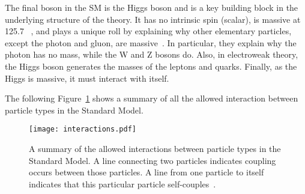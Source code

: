 The final boson in the SM is the Higgs boson and is a key building block
in the underlying structure of the theory. It has no intrinsic spin
(scalar), is massive at 125.7 \GeVcc~\cite{higgstwiki}, and plays a unique roll by
explaining why other elementary particles, except the photon and gluon, are
massive~\cite{discovery}. In particular, they explain why the photon has no
mass, while the W and Z bosons do. Also, in electroweak theory, the Higgs
boson generates the masses of the leptons and quarks. Finally, as the Higgs is
massive, it must interact with itself.

The following Figure~\ref{fig:intro_int} shows a summary of all the allowed
interaction between particle types in the Standard Model.
\begin{figure}[!hbt]
\centering
\texttt{[image: interactions.pdf]}
\caption[A summary of the allowed interactions between particle types in the Standard Model]
{\label{fig:intro_int}
A summary of the allowed interactions between particle types in the
Standard Model. A line connecting two particles indicates coupling occurs
between those particles. A line from one particle to itself indicates
that this particular particle self-couples~\cite{wikiinteractions}.
}
\end{figure}

